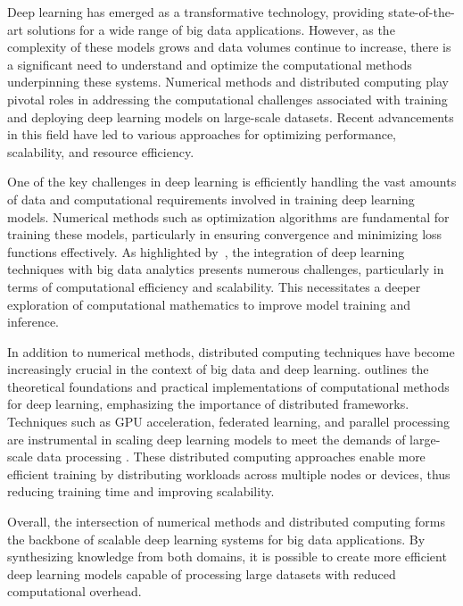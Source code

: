 

Deep learning has emerged as a transformative technology, providing state-of-the-art solutions for a wide range of big data applications. 
However, as the complexity of these models grows and data volumes continue to increase, there is a significant need to understand and optimize the computational methods underpinning these systems.
 Numerical methods and distributed computing play pivotal roles in addressing the computational challenges associated with training and deploying deep learning models on large-scale datasets.
Recent advancements in this field have led to various approaches for optimizing performance, scalability, and resource efficiency.

One of the key challenges in deep learning is efficiently handling the vast amounts of data and computational requirements involved in training deep learning models. 
Numerical methods such as optimization algorithms are fundamental for training these models, particularly in ensuring convergence and minimizing loss functions effectively.
 As highlighted by~\cite{najafabadi2015deep}, the integration of deep learning techniques with big data analytics presents numerous challenges, particularly in terms of computational efficiency and scalability. This necessitates a deeper exploration of computational mathematics to improve model training and inference.

In addition to numerical methods, distributed computing techniques have become increasingly crucial in the context of big data and deep learning.\cite{yan2023computational} 
outlines the theoretical foundations and practical implementations of computational methods for deep learning, emphasizing the importance of distributed frameworks. 
Techniques such as GPU acceleration, federated learning, and parallel processing are instrumental in scaling deep learning models to meet the demands of large-scale data processing \cite{dehghani2023distributed}. 
These distributed computing approaches enable more efficient training by distributing workloads across multiple nodes or devices, thus reducing training time and improving scalability.

Overall, the intersection of numerical methods and distributed computing forms the backbone of scalable deep learning systems for big data applications. 
By synthesizing knowledge from both domains, it is possible to create more efficient deep learning models capable of processing large datasets with reduced computational overhead.

